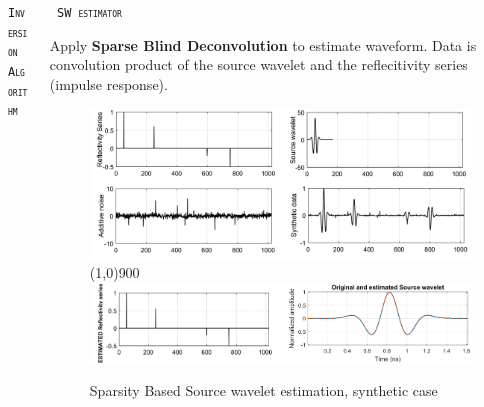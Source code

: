 \documentclass[final]{beamer}
\newlength{\onecolwid}
\newlength{\twocolwid}
\begin{document}
\begin{frame}[t]
\begin{columns}[t]
\begin{column}{\twocolwid}
\begin{columns}[t,totalwidth=\twocolwid]
\begin{column}{\onecolwid}
\begin{block}{\textsc{\texttt{Inversion Algorithm}}}
\end{block}


\end{column} %

\begin{column}{\onecolwid}\vspace{-.6in} %


\begin{block}{\textsc{\texttt{ SW estimator}}}
	
Apply \textbf{Sparse Blind Deconvolution} to estimate  waveform. Data is convolution product of the source wavelet and the reflecitivity series (impulse response).

	\begin{figure}
		\includegraphics[width=1\linewidth]{synthtic_model_SBD.png}
		\vspace{-3mm}
		\line(1,0){900}
		\vspace{1cm}
		\includegraphics[width=0.98\linewidth]{SBD_synthetic_refl.png}
		\caption{Sparsity Based Source wavelet estimation, synthetic case \cite{jazayeri2017sparse}}
	\end{figure}
	
\end{block}


\end{column}
\end{columns}
\end{column}
\end{columns}
\end{frame}
\end{document}
